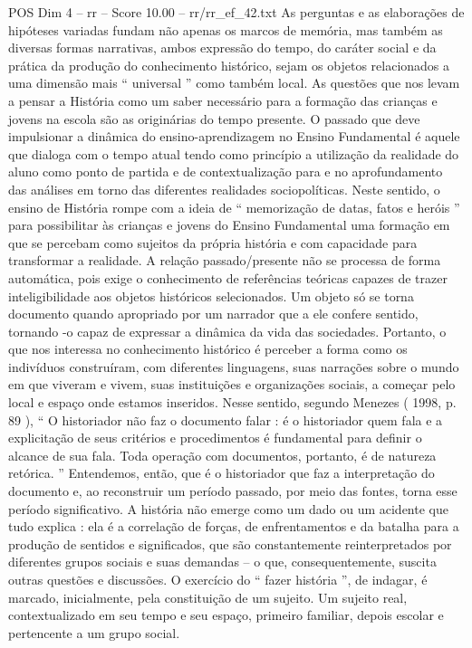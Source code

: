 \begin{textsample}{POS Dim 4 – rr – Score 10.00 – rr/rr\_ef\_42.txt}
As perguntas e as elaborações de hipóteses variadas fundam não apenas os marcos de memória, mas também as diversas formas narrativas, ambos expressão do tempo, do caráter social e da prática da produção do conhecimento histórico, sejam os objetos relacionados a uma dimensão mais “ universal ” como também local.
As questões que nos levam a pensar a História como um saber necessário para a formação das crianças e jovens na escola são as originárias do tempo presente.
O passado que deve impulsionar a dinâmica do ensino-aprendizagem no Ensino Fundamental é aquele que dialoga com o tempo atual tendo como princípio a utilização da realidade do aluno como ponto de partida e de contextualização para e no aprofundamento das análises em torno das diferentes realidades sociopolíticas.
Neste sentido, o ensino de História rompe com a ideia de “ memorização de datas, fatos e heróis ” para possibilitar às crianças e jovens do Ensino Fundamental uma formação em que se percebam como sujeitos da própria história e com capacidade para transformar a realidade.
A relação passado/presente não se processa de forma automática, pois exige o conhecimento de referências teóricas capazes de trazer inteligibilidade aos objetos históricos selecionados.
Um objeto só se torna documento quando apropriado por um narrador que a ele confere sentido, tornando -o capaz de expressar a dinâmica da vida das sociedades.
Portanto, o que nos interessa no conhecimento histórico é perceber a forma como os indivíduos construíram, com diferentes linguagens, suas narrações sobre o mundo em que viveram e vivem, suas instituições e organizações sociais, a começar pelo local e espaço onde estamos inseridos.
Nesse sentido, segundo Menezes ( 1998, p. 89 ), “ O historiador não faz o documento falar : é o historiador quem fala e a explicitação de seus critérios e procedimentos é fundamental para definir o alcance de sua fala.
Toda operação com documentos, portanto, é de natureza retórica. ” Entendemos, então, que é o historiador que faz a interpretação do documento e, ao reconstruir um período passado, por meio das fontes, torna esse período significativo.
A história não emerge como um dado ou um acidente que tudo explica : ela é a correlação de forças, de enfrentamentos e da batalha para a produção de sentidos e significados, que são constantemente reinterpretados por diferentes grupos sociais e suas demandas – o que, consequentemente, suscita outras questões e discussões.
O exercício do “ fazer história ”, de indagar, é marcado, inicialmente, pela constituição de um sujeito.
Um sujeito real, contextualizado em seu tempo e seu espaço, primeiro familiar, depois escolar e pertencente a um grupo social.

\end{textsample}
